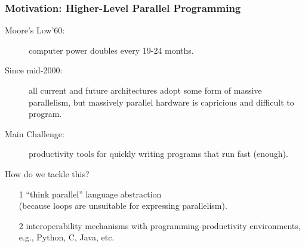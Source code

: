\documentclass[rgb,dvipsnames]{beamer}
\renewcommand{\emph}[1]{\textcolor{structure}{#1}}
\newcommand{\emphh}[1]{\textcolor{CosGreen}{ #1}}
\begin{document}
\begin{frame}[fragile,t]
   \frametitle{Motivation: Higher-Level Parallel Programming}

\begin{description}
    \item[\emphh{Moore's Low'60:}] computer power doubles every 19-24 months.\medskip
    \item[\emphh{Since mid-2000:}] all current and future architectures adopt some form of massive parallelism,
            but massively parallel hardware is capricious and difficult to program.\medskip 
    \item[\emphh{Main Challenge:}] productivity tools for quickly writing programs that run fast (enough).\medskip
\end{description}
\bigskip

\emph{How do we tackle this?}
\begin{itemize}
    \item[1] ``think parallel'' language abstraction\\
            (because loops are unsuitable for expressing parallelism).\medskip
    \item[2] interoperability mechanisms with programming-productivity environments, e.g., Python, C, Java, etc.
\end{itemize}

\end{frame}
\end{document}
